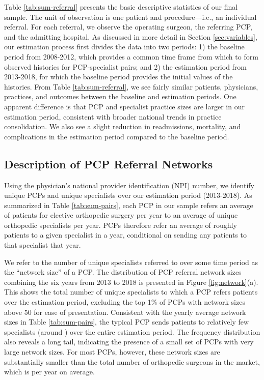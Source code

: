 \documentclass[12pt]{article}
\begin{document}
Table \ref{tab:sum-referral} presents the basic descriptive statistics of our final sample. The unit of observation is one patient and procedure---i.e., an individual referral. For each referral, we observe the operating surgeon, the referring PCP, and the admitting hospital. As discussed in more detail in Section \ref{sec:variables}, our estimation process first divides the data into two periods: 1) the baseline period from 2008-2012, which provides a common time frame from which to form observed histories for PCP-specialist pairs; and 2) the estimation period from 2013-2018, for which the baseline period provides the initial values of the histories. From Table \ref{tab:sum-referral}, we see fairly similar patients, physicians, practices, and outcomes between the baseline and estimation periods. One apparent difference is that PCP and specialist practice sizes are larger in our estimation period, consistent with broader national trends in practice consolidation. We also see a slight reduction in readmissions, mortality, and complications in the estimation period compared to the baseline period. 

\subsection{Description of PCP Referral Networks}
\label{sec:network-description}
Using the physician's national provider identification (NPI) number, we identify \nPCPs{} unique PCPs and \nSpecialists{} unique specialists over our estimation period (2013-2018). As summarized in Table \ref{tab:sum-pairs}, each PCP in our sample refers an average of \meanRefsPerPCP{} patients for elective orthopedic surgery per year to an average of \meanSpecsPerPCP{} unique orthopedic specialists per year. PCPs therefore refer an average of roughly \meanRefsPerPair{} patients to a given specialist in a year, conditional on sending any patients to that specialist that year. 

We refer to the number of unique specialists referred to over some time period as the ``network size'' of a PCP. The distribution of PCP referral network sizes combining the six years from 2013 to 2018 is presented in Figure \ref{fig:network}(a). This shows the total number of unique specialists to which a PCP refers patients over the estimation period, excluding the top 1\% of PCPs with network sizes above 50 for ease of presentation. Consistent with the yearly average network sizes in Table \ref{tab:sum-pairs}, the typical PCP sends patients to relatively few specialists (around \cumlNetworkSize{}) over the entire estimation period. The frequency distribution also reveals a long tail, indicating the presence of a small set of PCPs with very large network sizes. For most PCPs, however, these network sizes are substantially smaller than the total number of orthopedic surgeons in the market, which is \specsPerHRRYear{} per year on average.
\end{document}
